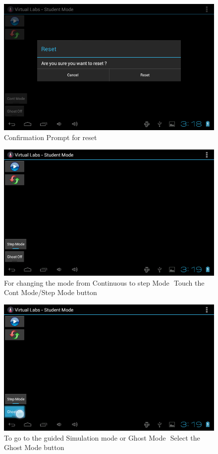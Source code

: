 \documentclass[12pt]{report}
\begin{document}
\begin{figure}[H]
 \centering
 \includegraphics[width=15cm]{./104.png}
 \caption{Confirmation Prompt for reset \label{fig:104}}
\end{figure}

\begin{figure}[H]
 \centering
 \includegraphics[width=15cm]{./106.png}
 \caption{For changing the mode from Continuous to step Mode ­ Touch the Cont Mode/Step Mode button\label{fig:106}}
\end{figure}

\begin{figure}[H]
 \centering
 \includegraphics[width=15cm]{./107.png}
 \caption{To go to the guided Simulation mode or Ghost Mode ­ Select the Ghost Mode button\label{fig:107}}
\end{figure}
\end{document}
